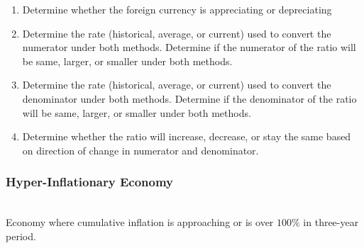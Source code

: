 \begin{method} 
\begin{enumerate}[label=\roman*.]
\setlength{\itemsep}{0pt}
\item Determine whether the foreign currency is appreciating or depreciating
\item Determine the rate (historical, average, or current) used to convert the numerator under both methods. Determine if the numerator of the ratio will be same, larger, or smaller under both methods.
\item Determine the rate (historical, average, or current) used to convert the denominator under both methods. Determine if the denominator of the ratio will be same, larger, or smaller under both methods.
\item Determine whether the ratio will increase, decrease, or stay the same based on direction of change in numerator and denominator.
\end{enumerate}
\end{method}

\subsubsection{Hyper-Inflationary Economy}

\begin{definition} \\
Economy where cumulative inflation is approaching or is over $100\%$ in three-year period.
\end{definition}

